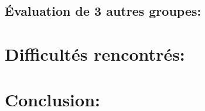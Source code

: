 \documentclass{report}
\begin{document}
\subsection*{Évaluation de 3 autres groupes:}
\begin{description}

\end{description}
\section*{Difficultés rencontrés:}
\begin{description}

\end{description}
\section*{Conclusion:}
\begin{description}

\end{description}
\end{document}
